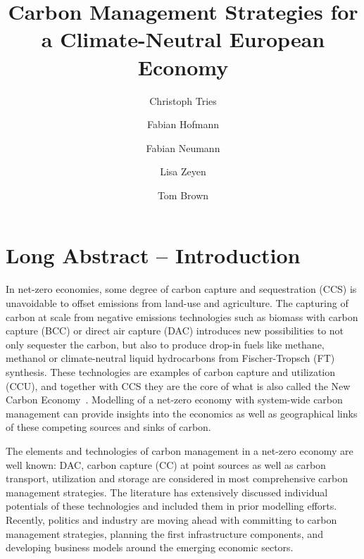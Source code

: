 \documentclass[10pt,5p,reversenotenum,lefttitle]{elsarticle}
\begin{document}
\begin{frontmatter}

	\title{Carbon Management Strategies for a Climate-Neutral European Economy}
    \author[tub]{Christoph Tries}
    \author[tub]{Fabian Hofmann}
    \author[tub]{Fabian Neumann}
    \author[tub]{Lisa Zeyen}
    \author[tub]{Tom Brown}
	\address[tub]{Department of Digital Transformation in Energy Systems, Institute of Energy Technology, Technische Universität Berlin, Fakultät III, Einsteinufer 25 (TA 8), 10587 Berlin, Germany}

\end{frontmatter}

\section*{Long Abstract -- Introduction}
\label{sec:long-abstract-introduction}
In net-zero economies, some degree of carbon capture and sequestration (CCS) is unavoidable to offset emissions from land-use and agriculture. The capturing of carbon at scale from negative emissions technologies such as biomass with carbon capture (BCC) or direct air capture (DAC) introduces new possibilities to not only sequester the carbon, but also to produce drop-in fuels like methane, methanol or climate-neutral liquid hydrocarbons from Fischer-Tropsch (FT) synthesis. These technologies are examples of carbon capture and utilization (CCU), and together with CCS they are the core of what is also called the New Carbon Economy~\cite{arniehellerNewCarbonEconomy2019}. Modelling of a net-zero economy with system-wide carbon management can provide insights into the economics as well as geographical links of these competing sources and sinks of carbon.

The elements and technologies of carbon management in a net-zero economy are well known: DAC, carbon capture (CC) at point sources as well as carbon transport, utilization and storage are considered in most comprehensive carbon management strategies. The literature has extensively discussed individual potentials of these technologies and included them in prior modelling
efforts.~\cite{burandtDecarbonizingChinaEnergy2019,caprosEnergysystemModellingEU2019,damoreOptimalDesignEuropean2021,larsonNetZeroAmericaPotential2021,maModelingOptimizationCombined2021,mikulcicFlexibleCarbonCapture2019,williamsCarbonNeutralPathwaysUnited2021} Recently, politics and industry are moving ahead with committing to carbon management strategies, planning the first infrastructure components, and developing business models around the emerging economic sectors.~\cite{adomaitisEquinorRWEBuild2023,apnewswireGermanyDrawLegislation2023,KohlenstoffKannKlimaschutz2023,OGETESJoin2022,TESHydrogenLife2023}
\end{document}
